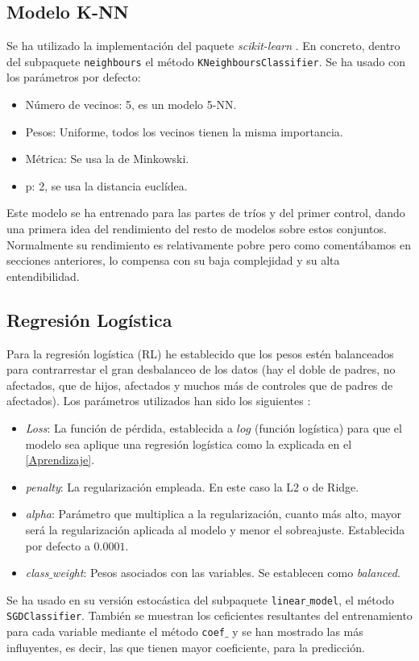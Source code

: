 \subsection{Modelo K-NN}
Se ha utilizado la implementación del paquete \textit{scikit-learn} \cite{scikit2021knn}. En concreto, dentro del subpaquete \texttt{neighbours} el método \texttt{KNeighboursClassifier}. Se ha usado con los parámetros por defecto:
\begin{itemize}
\itemsep 0em 
  \item Número de vecinos: 5, es un modelo 5-NN.
  \item Pesos: Uniforme, todos los vecinos tienen la misma importancia.
  \item Métrica: Se usa la de Minkowski.
  \item p: 2, se usa la distancia euclídea.
\end{itemize}
Este modelo se ha entrenado para las partes de tríos y del primer control, dando una primera idea del rendimiento del resto de modelos sobre estos conjuntos. Normalmente su rendimiento es relativamente pobre pero como comentábamos en secciones anteriores, lo compensa con su baja complejidad y su alta entendibilidad.

\subsection{Regresión Logística}
Para la regresión logística (RL) he establecido que los pesos estén balanceados para contrarrestar el gran desbalanceo de los datos (hay el doble de padres, no afectados, que de hijos, afectados y muchos más de controles que de padres de afectados). Los parámetros utilizados han sido los siguientes \cite{scikit2021lr}:
\begin{itemize}
\itemsep 0em 
  \item \textit{Loss}: La función de pérdida, establecida a $log$ (función logística) para que el modelo sea aplique una regresión logística como la explicada en el \autoref{Aprendizaje}.
  \item \textit{penalty}: La regularización empleada. En este caso la L2 o de Ridge.
  \item \textit{alpha}: Parámetro que multiplica a la regularización, cuanto más alto, mayor será la regularización aplicada al modelo y menor el sobreajuste. Establecida por defecto a $0.0001$.
  \item \textit{class$\_$weight}: Pesos asociados con las variables. Se establecen como \textit{balanced}.
\end{itemize}
Se ha usado en su versión estocástica del subpaquete \texttt{linear$\_$model}, el método \texttt{SGDClassifier}. También se muestran los ceficientes resultantes del entrenamiento para cada variable mediante el método \texttt{coef$\_$} y se han mostrado las más influyentes, es decir, las que tienen mayor coeficiente, para la predicción.
